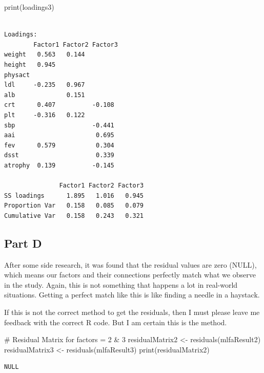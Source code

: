 \documentclass[
  letterpaper,
  DIV=11,
  numbers=noendperiod]{scrartcl}
\newenvironment{Shaded}{}{}
\newcommand{\CommentTok}[1]{\textcolor[rgb]{0.57,0.51,0.45}{#1}}
\newcommand{\FunctionTok}[1]{\textcolor[rgb]{0.41,0.62,0.42}{#1}}
\newcommand{\NormalTok}[1]{\textcolor[rgb]{0.24,0.22,0.21}{#1}}
\newcommand{\OtherTok}[1]{\textcolor[rgb]{0.41,0.62,0.42}{#1}}
\begin{document}
\begin{Shaded}
\begin{Highlighting}[]
\FunctionTok{print}\NormalTok{(loadings3)}
\end{Highlighting}
\end{Shaded}

\begin{verbatim}

Loadings:
        Factor1 Factor2 Factor3
weight   0.563   0.144         
height   0.945                 
physact                        
ldl     -0.235   0.967         
alb              0.151         
crt      0.407          -0.108 
plt     -0.316   0.122         
sbp                     -0.441 
aai                      0.695 
fev      0.579           0.304 
dsst                     0.339 
atrophy  0.139          -0.145 

               Factor1 Factor2 Factor3
SS loadings      1.895   1.016   0.945
Proportion Var   0.158   0.085   0.079
Cumulative Var   0.158   0.243   0.321
\end{verbatim}

\newpage{}

\hypertarget{part-d}{%
\subsection{Part D}\label{part-d}}

After some side research, it was found that the residual values are zero
(NULL), which means our factors and their connections perfectly match
what we observe in the study. Again, this is not something that happens
a lot in real-world situations. Getting a perfect match like this is
like finding a needle in a haystack.

If this is not the correct method to get the residuals, then I must
please leave me feedback with the correct R code. But I am certain this
is the method.

\begin{Shaded}
\begin{Highlighting}[]
\CommentTok{\# Residual Matrix for factors = 2 \& 3}
\NormalTok{residualMatrix2 }\OtherTok{\textless{}{-}} \FunctionTok{residuals}\NormalTok{(mlfaResult2)}
\NormalTok{residualMatrix3 }\OtherTok{\textless{}{-}} \FunctionTok{residuals}\NormalTok{(mlfaResult3)}
\FunctionTok{print}\NormalTok{(residualMatrix2)}
\end{Highlighting}
\end{Shaded}

\begin{verbatim}
NULL
\end{verbatim}
\end{document}
